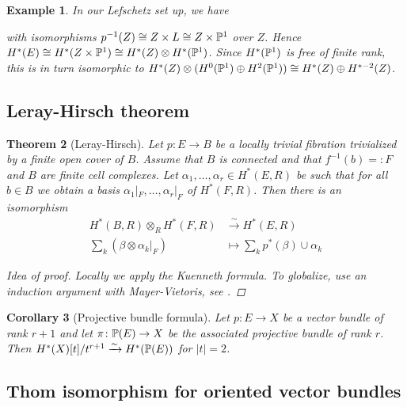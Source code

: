 \documentclass[A4paper, british, reqno]{amsart}
\theoremstyle{darkgreentheorem}
\newtheorem{thm}{Theorem}[section]
\newtheorem{cor}[thm]{Corollary}
\theoremstyle{darkbluedefinition}
\theoremstyle{darkredexample}
\newtheorem{exa}[thm]{Example}
\theoremstyle{remark}
\newcommand{\1}{\mathbbm{1}}
\newcommand{\ot}{\otimes}
\newcommand{\op}{\oplus}
\begin{document}
\begin{exa}
    In our Lefschetz set up, we have
    \begin{center}
    \end{center}
    with isomorphisms $p^{-1}(Z)\cong Z\times L\cong Z\times \P^{1}$ over $Z$.
    Hence $H^{*}(E)\cong H^{*}(Z\times \P^{1})\cong H^{*}(Z)\ot H^{*}(\P^{1})$.
    Since $H^{*}(\P^{1})$ is free of finite rank, this is in turn isomorphic to $H^{*}(Z)\ot (H^{0}(\P^{1})\op H^{2}(\P^{1}))\cong H^{*}(Z)\op H^{*-2}(Z)$.
\end{exa}

\subsection{Leray-Hirsch theorem}

\begin{thm}[Leray-Hirsch]
    Let $p\colon E\to B$ be a locally trivial fibration trivialized by a finite open cover of $B$.
    Assume that $B$ is connected and that $f^{-1}(b)=:F$ and $B$ are finite cell complexes.
    Let $\alpha_{1},\ldots,\alpha_{r}\in H^{*}(E,R)$ be such that for all $b\in B$ we obtain a basis $\alpha_{1}|_{F},\ldots,\alpha_{r}|_{F}$ of $H^{*}(F,R)$.
    Then there is an isomorphism
    \begin{align*}
	H^{*}(B,R)\ot_{R} H^{*}(F,R) & \xrightarrow{\sim} H^{*}(E,R) \\
	\sum_{k}(\beta\ot \alpha_{k}|_{F}) & \mapsto \sum_{k}p^{*}(\beta)\cup \alpha_{k}
    \end{align*}
    \begin{proof}[Idea of proof]
	Locally we apply the Kuenneth formula.
	To globalize, use an induction argument with Mayer-Vietoris, see \cite[Section 4.D]{hat02}.
    \end{proof}
\end{thm}

\begin{cor}[Projective bundle formula]
    Let $p\colon E\to X$ be a vector bundle of rank $r+1$ and let $\pi\colon \P(E)\to X$ be the associated projective bundle of rank $r$.
    Then $H^{*}(X)[t]/t^{r+1} \xrightarrow{\sim} H^{*}(\P(E))$ for $|t|=2$.
\end{cor}

\subsection{Thom isomorphism for oriented vector bundles}
\end{document}
